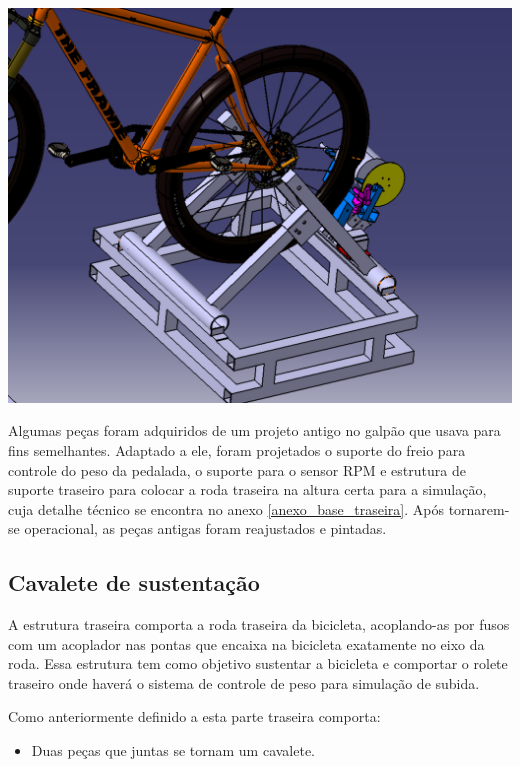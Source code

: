     \begin{center}
        \includegraphics[scale=0.5]{figuras/parte_traseira}
        \label{parte_traseira_1}
    \end{center}  


   Algumas peças foram adquiridos de um projeto antigo no galpão que usava para fins semelhantes. Adaptado a ele, foram projetados o suporte do freio para controle do peso da pedalada, o suporte para o sensor RPM e estrutura de suporte traseiro para colocar a roda traseira na altura certa para a simulação, cuja detalhe técnico se encontra no anexo \ref{anexo_base_traseira}. Após tornarem-se operacional, as peças antigas foram reajustados e pintadas.

\subsection{Cavalete de sustentação}

    A estrutura traseira comporta a roda traseira da bicicleta, acoplando-as por fusos com um acoplador nas pontas que encaixa na bicicleta exatamente no eixo da roda. Essa estrutura tem como objetivo sustentar a bicicleta e comportar o rolete traseiro onde haverá o sistema de controle de peso para simulação de subida.

    Como anteriormente definido a esta parte traseira comporta:
    \begin{itemize}
        \item Duas peças que juntas se tornam um cavalete.
    \end{itemize}
    
